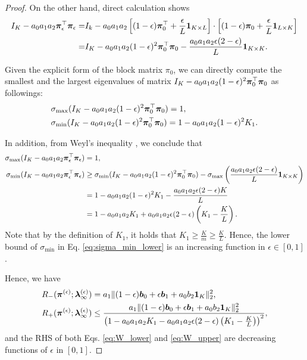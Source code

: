 \begin{proof}
On the other hand, direct calculation shows 
\begin{align*}
    I_K - a_0 a_1 a_2 \bm{\pi}_{\epsilon}^{\top} \bm{\pi}_{\epsilon} = &I_k - a_0a_1a_2 \left[(1-\epsilon)\bm{\pi}^{\top}_0 +\frac{\epsilon}{L} \bm{1}_{K\times L}\right] \cdot \left[(1-\epsilon)\bm{\pi}_0 +\frac{\epsilon}{L} \bm{1}_{L\times K}\right] \\ 
    =& I_K - a_0a_1a_2(1-\epsilon)^2\bm{\pi}^{\top}_0\bm{\pi}_0 - \frac{a_0a_1a_2\epsilon(2-\epsilon)}{L}\bm{1}_{K\times K}.
\end{align*}

Given the explicit form of the block matrix $\pi_0$, we can directly compute the smallest and the largest eigenvalues of matrix $I_K - a_0 a_1 a_2(1-\epsilon)^2 \bm{\pi}_0^{\top} \bm{\pi}_0$ as followings: 
\begin{align}\notag
    & \sigma_{\max}(I_K - a_0 a_1 a_2(1-\epsilon)^2 \bm{\pi}_0^{\top} \bm{\pi}_0)=1, \\ \notag
    & \sigma_{\min}(I_K - a_0 a_1 a_2(1-\epsilon)^2 \bm{\pi}_0^{\top} \bm{\pi}_0)= 1-a_0a_1a_2(1-\epsilon)^2K_1.
\end{align}

In addition, from Weyl's inequality \cite{fan1949theorem,bunch1978rank}, we conclude that 
\begin{align}\notag
     \sigma_{\max}(I_K - a_0 a_1 a_2 \bm{\pi}_{\epsilon}^{\top} \bm{\pi}_{\epsilon})&=1, \\ \notag
     \sigma_{\min}(I_K - a_0 a_1 a_2 \bm{\pi}_{\epsilon}^{\top} \bm{\pi}_{\epsilon}) &\geq \sigma_{\min}(I_K - a_0 a_1 a_2(1-\epsilon)^2 \bm{\pi}_0^{\top} \bm{\pi}_0) - \sigma_{\max}\left(\frac{a_0a_1a_2\epsilon(2-\epsilon)}{L}\bm{1}_{K\times K}\right) \\ \notag 
     & = 1-a_0a_1a_2(1-\epsilon)^2K_1 - \frac{a_0a_1a_2\epsilon(2-\epsilon)K}{L} \\
     \label{eq:sigma_min_lower}
     &= 1-a_0a_1a_2K_1+ a_0a_1a_2\epsilon(2-\epsilon)\left(K_1-\frac{K}{L}\right).
\end{align}
Note that by the definition of $K_1$, it holds that $K_1\geq \frac{K}{m} \geq \frac{K}{L}$. Hence, the lower bound of $\sigma_{\min}$ in Eq. \eqref{eq:sigma_min_lower} is an increasing function in $\epsilon\in[0,1]$.

Hence, we have 
\begin{align}\label{eq:W_lower}
   & R_{-}(\bm{\pi}^{(\epsilon)}; \bm{\lambda}_{\infty}^{(\epsilon)})=a_1\|(1-\epsilon)\bm{b}_0 + \epsilon \bm{b}_1+ a_0 b_2 \bm{1}_K\|_2^2, \\\label{eq:W_upper}
   & R_{+}(\bm{\pi}^{(\epsilon)}; \bm{\lambda}_{\infty}^{(\epsilon)})\leq \frac{a_1\|(1-\epsilon)\bm{b}_0 + \epsilon \bm{b}_1+ a_0 b_2 \bm{1}_K\|_2^2}{\left(1-a_0a_1a_2K_1- a_0a_1a_2\epsilon(2-\epsilon)\left(K_1-\frac{K}{L}\right)\right)^2},
\end{align}
and the RHS of both Eqs. \eqref{eq:W_lower} and \eqref{eq:W_upper} are decreasing functions of $\epsilon$ in $[0,1]$.


\end{proof}
